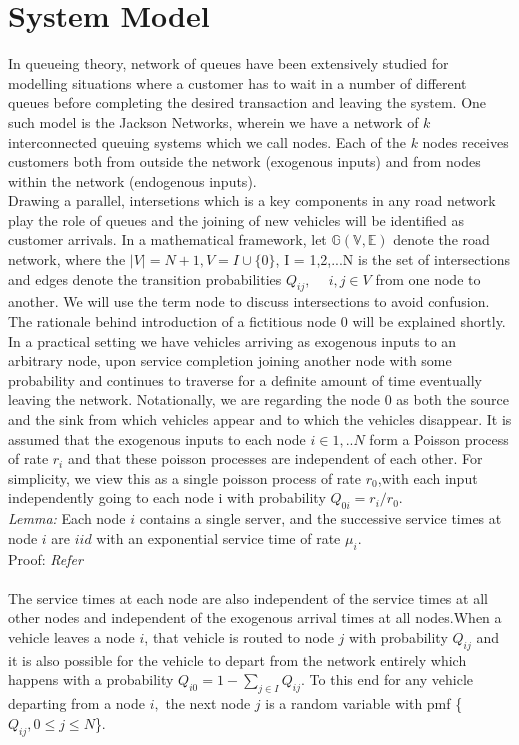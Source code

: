\documentclass[a4paper,12pt]{scrartcl}
\begin{document}
\section*{System Model}
In queueing theory, network of queues have been extensively studied for modelling situations where a customer has to wait in a number of different queues before completing the desired transaction and leaving the system.
One such model is the Jackson Networks, wherein we have a network of $k$ interconnected queuing systems which we call nodes.
Each of the $k$ nodes receives customers both from outside the network (exogenous inputs) and from nodes within the network (endogenous inputs).\\ 
Drawing a parallel, intersetions which is a key components in any road network play the role of queues and the joining of new vehicles will be identified as customer arrivals.
In a mathematical framework, let $\mathbb{G(V,E)}$ denote the road network, where the $|V|=N+1 , V = I \cup \{0\}$, I = {1,2,...N} is the set of intersections and edges denote the transition probabilities $Q_{ij}, ~ \quad i,j\in V$ from one node to another. We will use the term node to discuss intersections to avoid confusion. The rationale behind introduction of a fictitious node $0$ will be explained shortly.\\ 
In a practical setting we have vehicles arriving as exogenous inputs to an arbitrary node, upon service completion joining another node with some probability and continues to traverse for a definite amount of time eventually leaving the network. Notationally, we are regarding the node $0$ as both the source and the sink from which vehicles appear and to which the vehicles disappear.
It is assumed that the exogenous inputs to each node $i\in {1,..N}$ form a Poisson process of rate $r_i$ and that these poisson processes are independent of each other. For simplicity, we view this as a single poisson process of rate $r_0$,with each input independently going to each node i with probability $Q_{0i} = r_i/r_0$.\\

\textit{Lemma:} Each node $i$ contains a single server, and the successive service times at node $i$ are $iid$ with an exponential service time of rate $\mu_i$.\\
Proof: \emph{Refer \cite{ross}}\\
\\
The service times at each node are also independent of the service times at all other nodes and independent of the exogenous arrival times at all nodes.When a vehicle leaves a node $i$, that vehicle is routed to node $j$ with probability $Q_{ij}$ and it is also possible for the vehicle to depart from the network entirely which happens with a probability $Q_{i0} = 1 - \sum_{j \in I}Q_{ij}.$ To this end for any vehicle departing from a node $i,$ the next node $j$ is a random variable with pmf \{$Q_{ij},0 \leq j \leq N$\}.
\end{document}
